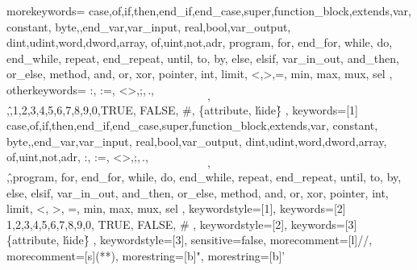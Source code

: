 

{
	morekeywords={
		case,of,if,then,end_if,end_case,super,function_block,extends,var,
		constant, byte,,end_var,var_input, real,bool,var_output,
		dint,udint,word,dword,array, of,uint,not,adr, program, for, end_for, while, do, end_while, repeat, end_repeat, until, to, by, else, elsif, var_in_out, and_then, or_else, method, and, or, xor, pointer, int, limit, <,>,=, min, max, mux, sel
	},
	otherkeywords={
		:, :=, <>,;,\,.,\[,\],\^,1,2,3,4,5,6,7,8,9,0,TRUE, FALSE, \#, \{attribute,  \'hide\'\}
	},
	keywords=[1]{
		case,of,if,then,end_if,end_case,super,function_block,extends,var,
		constant, byte,,end_var,var_input, real,bool,var_output,
		dint,udint,word,dword,array, of,uint,not,adr, :, :=, <>,;,\,.,\[,\],\^,program, for, end_for, while, do, end_while, repeat, end_repeat, until, to, by, else, elsif, var_in_out, and_then, or_else, method, and, or, xor, pointer, int, limit, <, >, =, min, max, mux, sel
	},
	keywordstyle=[1]\color{blue},
	keywords=[2]{
		1,2,3,4,5,6,7,8,9,0, TRUE, FALSE, \#
	},
	keywordstyle=[2]\color{codepurple},
	keywords=[3]{
		\{attribute,  \'hide\'\}
	},
	keywordstyle=[3]\color{codegray},
	sensitive=false,
	morecomment=[l]{//}, 
	morecomment=[s]{(*}{*)},
	morestring=[b]{"},
	morestring=[b]{'}
}


